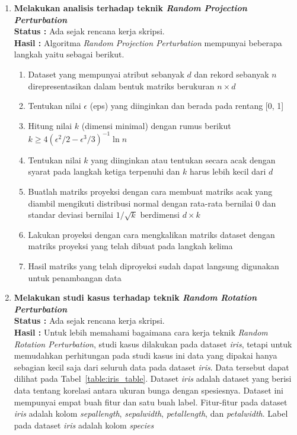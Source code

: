 \documentclass[a4paper,twoside]{article}
\begin{document}
\begin{enumerate}
		\item \textbf{Melakukan analisis terhadap teknik \textit{Random Projection Perturbation}}\\
		{\bf Status :} Ada sejak rencana kerja skripsi.\\
		{\bf Hasil :} Algoritma \textit{Random Projection Perturbation} mempunyai beberapa langkah yaitu sebagai berikut.
		\begin{enumerate}
			\item Dataset yang mempunyai atribut sebanyak \(d\) dan rekord sebanyak \(n\) direpresentasikan dalam bentuk matriks berukuran \(n \times d\)
			\item Tentukan nilai \(\epsilon\) (eps) yang diinginkan dan berada pada rentang [0, 1]
			\item Hitung nilai \(k\) (dimensi minimal) dengan rumus berikut \(k \geq 4(\epsilon^{2}/2-\epsilon^{3}/3)^{-1}\ln{n}\)
			\item Tentukan nilai \(k\) yang diinginkan atau tentukan secara acak dengan syarat pada langkah ketiga terpenuhi dan \(k\) harus lebih kecil dari \(d\)
			\item Buatlah matriks proyeksi dengan cara membuat matriks acak yang diambil mengikuti distribusi normal dengan rata-rata bernilai 0 dan standar deviasi bernilai \(1/\sqrt{k}\) berdimensi \(d \times k\)
			\item Lakukan proyeksi dengan cara mengkalikan matriks dataset dengan matriks proyeksi yang telah dibuat pada langkah kelima
			\item Hasil matriks yang telah diproyeksi sudah dapat langsung digunakan untuk penambangan data
		\end{enumerate}

		\item \textbf{Melakukan studi kasus terhadap teknik \textit{Random Rotation Perturbation}}\\
		{\bf Status :} Ada sejak rencana kerja skripsi.\\
		{\bf Hasil :} Untuk lebih memahami bagaimana cara kerja teknik \textit{Random Rotation Perturbation}, studi kasus dilakukan pada dataset \textit{iris}, tetapi untuk memudahkan perhitungan pada studi kasus ini data yang dipakai hanya sebagian kecil saja dari seluruh data pada dataset \textit{iris}. Data tersebut dapat dilihat pada Tabel~\ref{table:iris_table}. Dataset \textit{iris} adalah dataset yang berisi data tentang korelasi antara ukuran bunga dengan spesiesnya. Dataset ini mempunyai empat buah fitur dan satu buah label. Fitur-fitur pada dataset \textit{iris} adalah kolom \textit{sepal\textunderscore length}, \textit{sepal\textunderscore width}, \textit{petal\textunderscore length}, dan \textit{petal\textunderscore width}. Label pada dataset \textit{iris} adalah kolom \textit{species}


\end{enumerate}
\end{document}
